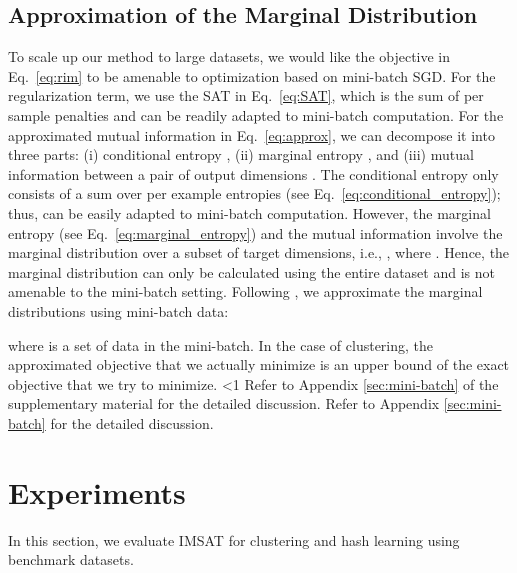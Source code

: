 \documentclass{article}
\theoremstyle{plain}
\newcounter{long}
\begin{document}
\subsection{Approximation of the Marginal Distribution}  \label{subsec:approximation}
To scale up our method to large datasets, we would like the objective in Eq.~\eqref{eq:rim} to be amenable to optimization based on mini-batch SGD. 
For the regularization term, we use the SAT in Eq.~\eqref{eq:SAT}, which is the sum of per sample penalties and can be readily adapted to mini-batch computation. For the approximated mutual information in Eq.~\eqref{eq:approx}, we can decompose it into three parts: (i) conditional entropy , (ii) marginal entropy , and (iii) mutual information between a pair of output dimensions . The conditional entropy only consists of a sum over per example entropies (see Eq.~\eqref{eq:conditional_entropy}); thus, can be easily adapted to mini-batch computation. However, the marginal entropy (see Eq.~\eqref{eq:marginal_entropy}) and the mutual information involve the marginal distribution over a subset of target dimensions, i.e., , where . Hence, the marginal distribution can only be calculated using the entire dataset and is not amenable to the mini-batch setting. Following \citet{springenberg2015unsupervised}, we approximate the marginal distributions using mini-batch data:

where  is a set of data in the mini-batch. In the case of clustering, the approximated objective that we actually minimize is an upper bound of the exact objective that we try to minimize.
\ifnum\value{long}<1
Refer to Appendix \ref{sec:mini-batch} of the supplementary material for the detailed discussion.
\else
Refer to Appendix \ref{sec:mini-batch} for the detailed discussion.
\fi



\section{Experiments}\label{sec:experiment}
In this section, we evaluate IMSAT for clustering and hash learning using benchmark datasets.
\end{document}
